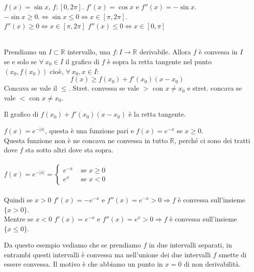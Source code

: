 $f(x) = \sin{x}$, $f: [0, 2\pi]$. $f'(x) = \cos{x}$ e $f''(x) = -\sin{x}$.\\
$-\sin{x} \geq 0. \Longleftrightarrow \sin{x} \leq 0 \Longleftrightarrow x \in [\pi, 2\pi]$.\\
$f''(x) \geq 0 \Longleftrightarrow x \in [\pi, 2\pi]$ \hspace{.5cm} $f''(x) \leq 0 \Longleftrightarrow x \in [0, \pi]$\\\\

\begin{proposition}
Prendiamo un $I \subset \mathbb{R}$ intervallo, una $f: I \to \mathbb{R}$ derivabile. Allora $f$ è convessa in $I$ se e solo se $\forall \: x_0 \in I$ il grafico di $f$ è sopra la retta tangente nel punto $(x_0, f(x_0))$ cioè, $\forall \: x_0, x\in I$:
\[f(x) \geq f(x_0) + f'(x_0)(x-x_0)\]
Concava se vale il $\leq$. Stret. convessa se vale $>$ con $x \neq x_0$ e stret. concava se vale $<$ con $x\neq x_0$.
\end{proposition}

\begin{note}
Il grafico  di $f(x_0) + f'(x_0)(x-x_0)$ è la retta tangente.
\end{note}

\begin{example}
$f(x) = e^{-|x|}$, questa è una funzione pari e $f(x) = e^{-x}$ se $x \geq 0$.\\
Questa funzione non è ne concava ne convessa in tutto $\mathbb{R}$, perché ci sono dei tratti dove $f$ sta sotto altri dove sta sopra.\\\\
$f(x) = e^{-|x|} = \begin{cases}e^{-x} & \text{ se } x\geq 0\\e^{x} & \text{ se } x < 0\end{cases}$ \\\\
Quindi se $x>0$ $f'(x) = -e^{-x}$ e $f''(x) = e^{-x} > 0 \Longrightarrow f$ è convessa sull'insieme $\{x>0\}.$\\
Mentre se $x<0$ $f'(x) = e^{-x}$ e $f''(x) = e^{x} > 0 \Longrightarrow f$ è convessa sull'insieme $\{x\leq0\}.$
\end{example}
\hspace{-15pt}Da questo esempio vediamo che se prendiamo $f$ in due intervalli separati, in entrambi questi intervalli è convessa ma nell'unione dei due intervalli $f$ smette di essere convessa. Il motivo è che abbiamo un punto in $x=0$ di non derivabilità.

